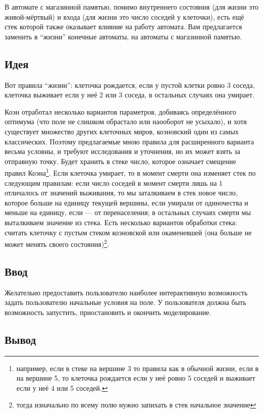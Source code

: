 \documentclass[12pt, oneside]{article}
\begin{document}
В автомате с магазинной памятью, помимо внутреннего состояния (для жизни это живой-мёртвый) и входа (для жизни это число соседей у клеточки), есть ещё стек которой также оказывает влияние на работу автомата. Вам предлагается заменить в ``жизни'' конечные автоматы, на автоматы с магазинной памятью.
\subsection*{Идея}
Вот правила ``жизни'': клеточка рождается, если у пустой клетки ровно 3 соседа, клеточка выживает если у неё 2 или 3 соседа, в остальных случаях она умирает.

Коэн отработал несколько вариантов параметров, добиваясь определённого оптимума (что поле не слишком обрастало или наооборот не усыхало), и хотя существует множество других клеточных миров, коэновский один из самых классических. Поэтому предлагаемые мною правила для расширенного варианта весьма условны, и требуют исследования и уточнения, но их может взять за отправную точку. Будет хранить в стеке число, которое означает смещение правил Коэна\footnote{например, если в стеке на вершине 3 то правила как в обычной жизни, если в на вершине 5, то клеточка рождается если у неё ровно 5 соседей и выживает если у неё 4 или 5 соседей.}. Если клеточка умирает, то в момент смерти она изменяет стек по следующим правилам: если число соседей в момент смерти лишь на 1 отличалось от значений выживания, то мы заталкиваем в стек новое число, которое больше на единицу текущей вершины, если умирали от одиночества и меньше на единицу, если --- от перенаселения; в остальных случаях смерти мы выталкиваем значение из стека. Есть несколько вариантов обработки стека: считать клеточку с пустым стеком коэновской или окаменевшей (она больше не может менять своего состояния)\footnote{тогда изначально по всему полю нужно запихать в стек начальное значение}.  

\subsection*{Ввод}

Желательно предоставить пользователю наиболее интерактивную возможность задать пользователю начальные условия на поле. У пользователя должна быть возможность запустить, приостановить и окончить моделирование.

\subsection*{Вывод}
\end{document}
